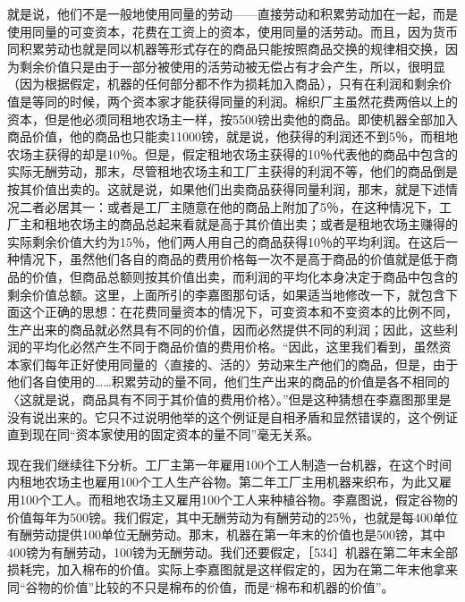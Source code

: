 就是说，他们不是一般地使用同量的劳动——直接劳动和积累劳动加在一起，而是使用同量的可变资本，花费在工资上的资本，使用同量的活劳动。而且，因为货币同积累劳动也就是同以机器等形式存在的商品只能按照商品交换的规律相交换，因为剩余价值只是由于一部分被使用的活劳动被无偿占有才会产生，所以，很明显（因为根据假定，机器的任何部分都不作为损耗加入商品），只有在利润和剩余价值是等同的时候，两个资本家才能获得同量的利润。棉织厂主虽然花费两倍以上的资本，但是他必须同租地农场主一样，按5500镑出卖他的商品。即使机器全部加入商品价值，他的商品也只能卖11000镑，就是说，他获得的利润还不到5％，而租地农场主获得的却是10％。但是，假定租地农场主获得的10％代表他的商品中包含的实际无酬劳动，那末，尽管租地农场主和工厂主获得的利润不等，他们的商品倒是按其价值出卖的。这就是说，如果他们出卖商品获得同量利润，那末，就是下述情况二者必居其一：或者是工厂主随意在他的商品上附加了5％，在这种情况下，工厂主和租地农场主的商品总起来看就是高于其价值出卖；或者是租地农场主赚得的实际剩余价值大约为15％，他们两人用自己的商品获得10％的平均利润。在这后一种情况下，虽然他们各自的商品的费用价格每一次不是高于商品的价值就是低于商品的价值，但商品总额则按其价值出卖，而利润的平均化本身决定于商品中包含的剩余价值总额。这里，上面所引的李嘉图那句话，如果适当地修改一下，就包含下面这个正确的思想：在花费同量资本的情况下，可变资本和不变资本的比例不同，生产出来的商品就必然具有不同的价值，因而必然提供不同的利润；因此，这些利润的平均化必然产生不同于商品价值的费用价格。“因此，这里我们看到，虽然资本家们每年正好使用同量的〈直接的、活的〉劳动来生产他们的商品，但是，由于他们各自使用的……积累劳动的量不同，他们生产出来的商品的价值是各不相同的〈这就是说，商品具有不同于其价值的费用价格〉。”但是这种猜想在李嘉图那里是没有说出来的。它只不过说明他举的这个例证是自相矛盾和显然错误的，这个例证直到现在同“资本家使用的固定资本的量不同”毫无关系。

现在我们继续往下分析。工厂主第一年雇用100个工人制造一台机器，在这个时间内租地农场主也雇用100个工人生产谷物。第二年工厂主用机器来织布，为此又雇用100个工人。而租地农场主又雇用100个工人来种植谷物。李嘉图说，假定谷物的价值每年为500镑。我们假定，其中无酬劳动为有酬劳动的25％，也就是每400单位有酬劳动提供100单位无酬劳动。那末，机器在第一年末的价值也是500镑，其中400镑为有酬劳动，100镑为无酬劳动。我们还要假定，［534］机器在第二年末全部损耗完，加入棉布的价值。实际上李嘉图就是这样假定的，因为在第二年末他拿来同“谷物的价值”比较的不只是棉布的价值，而是“棉布和机器的价值”。

